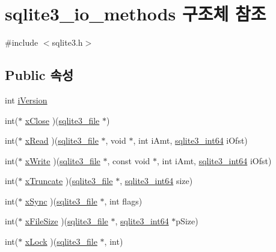 \hypertarget{structsqlite3__io__methods}{}\section{sqlite3\+\_\+io\+\_\+methods 구조체 참조}
\label{structsqlite3__io__methods}


{\ttfamily \#include $<$sqlite3.\+h$>$}

\subsection*{Public 속성}
\begin{DoxyCompactItemize}
\item 
int \hyperlink{structsqlite3__io__methods_ad1c72bdfde750a09a797f314a096a965}{i\+Version}
\item 
int($\ast$ \hyperlink{structsqlite3__io__methods_ae0673b03bfa033d59188bfdab418cd26}{x\+Close} )(\hyperlink{structsqlite3__file}{sqlite3\+\_\+file} $\ast$)
\item 
int($\ast$ \hyperlink{structsqlite3__io__methods_ac1433ffc0da0414a2a67a46d338d83eb}{x\+Read} )(\hyperlink{structsqlite3__file}{sqlite3\+\_\+file} $\ast$, void $\ast$, int i\+Amt, \hyperlink{sqlite3_8h_a0a4d3e6c1ad46f90e746b920ab6ca0d2}{sqlite3\+\_\+int64} i\+Ofst)
\item 
int($\ast$ \hyperlink{structsqlite3__io__methods_a659f6a40777b685c6a6b80e5f07a3328}{x\+Write} )(\hyperlink{structsqlite3__file}{sqlite3\+\_\+file} $\ast$, const void $\ast$, int i\+Amt, \hyperlink{sqlite3_8h_a0a4d3e6c1ad46f90e746b920ab6ca0d2}{sqlite3\+\_\+int64} i\+Ofst)
\item 
int($\ast$ \hyperlink{structsqlite3__io__methods_abe797948913bfe94d4fab7246773af50}{x\+Truncate} )(\hyperlink{structsqlite3__file}{sqlite3\+\_\+file} $\ast$, \hyperlink{sqlite3_8h_a0a4d3e6c1ad46f90e746b920ab6ca0d2}{sqlite3\+\_\+int64} size)
\item 
int($\ast$ \hyperlink{structsqlite3__io__methods_ad4b78f6b0b475e621fe29fb1cc886437}{x\+Sync} )(\hyperlink{structsqlite3__file}{sqlite3\+\_\+file} $\ast$, int flags)
\item 
int($\ast$ \hyperlink{structsqlite3__io__methods_ae875f158de72435f40ca0bd5207d9862}{x\+File\+Size} )(\hyperlink{structsqlite3__file}{sqlite3\+\_\+file} $\ast$, \hyperlink{sqlite3_8h_a0a4d3e6c1ad46f90e746b920ab6ca0d2}{sqlite3\+\_\+int64} $\ast$p\+Size)
\item 
int($\ast$ \hyperlink{structsqlite3__io__methods_ac88793475b0c4188fb02c229f1a11e8b}{x\+Lock} )(\hyperlink{structsqlite3__file}{sqlite3\+\_\+file} $\ast$, int)

\end{DoxyCompactItemize}
